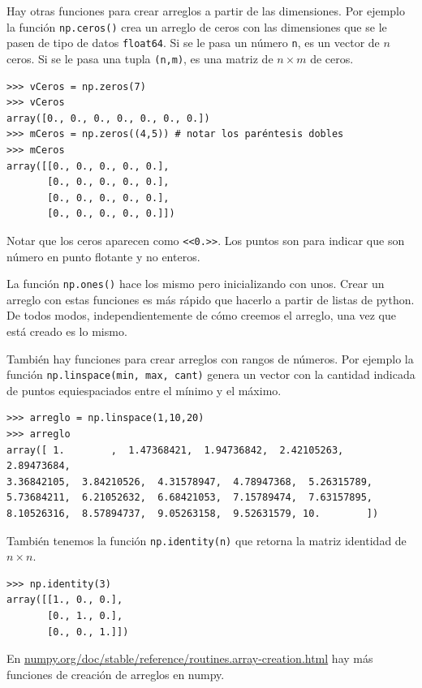 \documentclass[a4paper, 12pt]{report}
\theoremstyle{definition}
\begin{document}
Hay otras funciones para crear arreglos a partir de las dimensiones. Por ejemplo la función {\tt np.ceros()} crea un arreglo de ceros con las dimensiones que se le pasen de tipo de datos {\tt float64}. Si se le pasa un número {\tt n}, es un vector de $n$ ceros. Si se le pasa una tupla {\tt (n,m)}, es una matriz de $n\times m$ de ceros.
\begin{verbatim}
>>> vCeros = np.zeros(7)
>>> vCeros
array([0., 0., 0., 0., 0., 0., 0.])
>>> mCeros = np.zeros((4,5)) # notar los paréntesis dobles
>>> mCeros
array([[0., 0., 0., 0., 0.],
       [0., 0., 0., 0., 0.],
       [0., 0., 0., 0., 0.],
       [0., 0., 0., 0., 0.]])
\end{verbatim}
Notar que los ceros aparecen como {\tt <<0.>>}. Los puntos son para indicar que son número en punto flotante y no enteros.

La función {\tt np.ones()} hace los mismo pero inicializando con unos. Crear un arreglo con estas funciones es más rápido que hacerlo a partir de listas de python. De todos modos, independientemente de cómo creemos el arreglo, una vez que está creado es lo mismo.

También hay funciones para crear arreglos con rangos de números. Por ejemplo la función {\tt np.linspace(min, max, cant)} genera un vector con la cantidad indicada de puntos equiespaciados entre el mínimo y el máximo.
\begin{verbatim}
>>> arreglo = np.linspace(1,10,20)
>>> arreglo
array([ 1.        ,  1.47368421,  1.94736842,  2.42105263,  2.89473684,
3.36842105,  3.84210526,  4.31578947,  4.78947368,  5.26315789,
5.73684211,  6.21052632,  6.68421053,  7.15789474,  7.63157895,
8.10526316,  8.57894737,  9.05263158,  9.52631579, 10.        ])
\end{verbatim}

También tenemos la función {\tt np.identity(n)} que retorna la matriz identidad de $n\times n$.
\begin{verbatim}
>>> np.identity(3)
array([[1., 0., 0.],
       [0., 1., 0.],
       [0., 0., 1.]])
\end{verbatim}

En \href{https://numpy.org/doc/stable/reference/routines.array-creation.html}{numpy.org/doc/stable/reference/routines.array-creation.html} hay más funciones de creación de arreglos en numpy.
\end{document}
